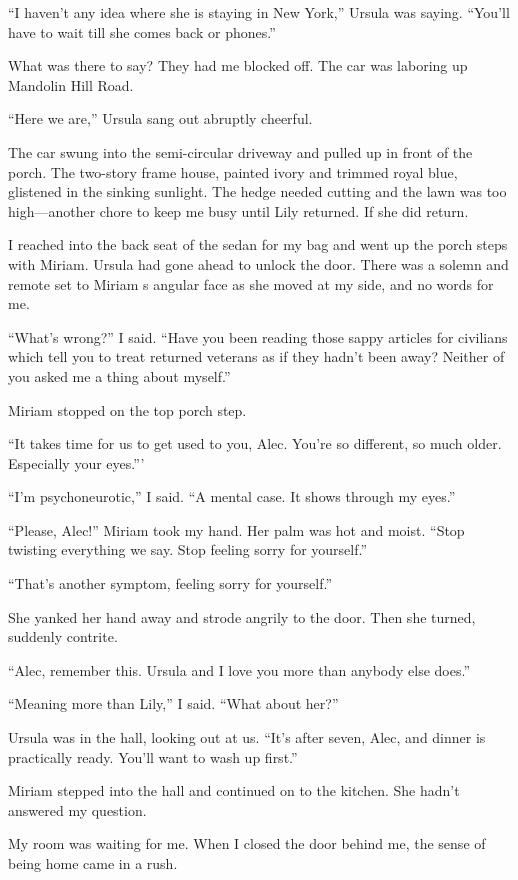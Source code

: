 \documentclass{novel}
\begin{document}
“I haven't any idea where she is staying in New York,” Ursula was saying. “You’ll have to wait till she comes back or phones.”

What was there to say? They had me blocked off. The car was laboring up Mandolin Hill Road.

“Here we are,” Ursula sang out abruptly cheerful.

The car swung into the semi-circular driveway and pulled up in front of the porch. The two-story frame house, painted ivory and trimmed royal blue, glistened in the sinking sunlight. The hedge needed cutting and the lawn was too high—another chore to keep me busy until Lily returned. If she did return.

I reached into the back seat of the sedan for my bag and went up the porch steps with Miriam. Ursula had gone ahead to unlock the door. There was a solemn and remote set to Miriam s angular face as she moved at my side, and no words for me.

“What’s wrong?” I said. “Have you been reading those sappy articles for civilians which tell you to treat returned veterans as if they hadn’t been away? Neither of you asked me a thing about myself.”

Miriam stopped on the top porch step.

“It takes time for us to get used to you, Alec. You’re so different, so much older. Especially your eyes.”’

“I’m psychoneurotic,” I said. “A mental case. It shows through my eyes.”

“Please, Alec!” Miriam took my hand. Her palm was hot and moist. “Stop twisting everything we say. Stop feeling sorry for yourself.”

“That’s another symptom, feeling sorry for yourself.”

She yanked her hand away and strode angrily to the door. Then she turned, suddenly contrite.

“Alec, remember this. Ursula and I love you more than anybody else does.”

“Meaning more than Lily,” I said. “What about her?”

Ursula was in the hall, looking out at us. “It’s after seven, Alec, and dinner is practically ready. You’ll want to wash up first.”

Miriam stepped into the hall and continued on to the kitchen. She hadn’t answered my question.

My room was waiting for me. When I closed the door behind me, the sense of being home came in a rush. 
\end{document}
